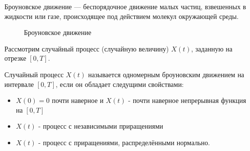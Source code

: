 Броуновское движение --- беспорядочное движение малых частиц, взвешенных в жидкости или газе, происходящее под действием молекул окружающей среды. 

\begin{figure}[ph!]
	\caption{Броуновское движение}
	\label{fig:brown_movement}
\end{figure}

Рассмотрим случайный процесс (случайную величину) $X(t)$, заданную на отрезке $[0,T]$.

Случайный процесс  $X(t)$ называется одномерным броуновским движением на интервале $[0,T]$, если он обладает следущими свойствами:
\begin{itemize} 
	\item $X(0) = 0$ почти наверное и $X(t)$ - почти наверное непрерывная функция на $[0,T]$
	\item $X(t)$ - процесс с независимыми приращениями
	\item  $X(t)$ -  процесс с приращениями, распределёнными нормально.
\end{itemize}


